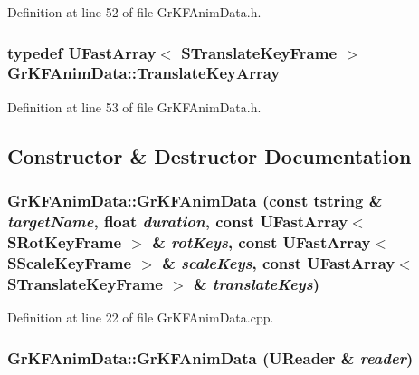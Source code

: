 Definition at line 52 of file GrKFAnimData.h.\hypertarget{class_gr_k_f_anim_data_38d6be96467bdb179c733bb1ed40d36f}{
\subsubsection[{TranslateKeyArray}]{\setlength{\rightskip}{0pt plus 5cm}typedef {\bf UFastArray}$<$ {\bf STranslateKeyFrame} $>$ {\bf GrKFAnimData::TranslateKeyArray}}}
\label{class_gr_k_f_anim_data_38d6be96467bdb179c733bb1ed40d36f}




Definition at line 53 of file GrKFAnimData.h.

\subsection{Constructor \& Destructor Documentation}
\hypertarget{class_gr_k_f_anim_data_3eb49b566e57e8864da2a6cd801af2fe}{
\subsubsection[{GrKFAnimData}]{\setlength{\rightskip}{0pt plus 5cm}GrKFAnimData::GrKFAnimData (const {\bf tstring} \& {\em targetName}, \/  float {\em duration}, \/  const {\bf UFastArray}$<$ {\bf SRotKeyFrame} $>$ \& {\em rotKeys}, \/  const {\bf UFastArray}$<$ {\bf SScaleKeyFrame} $>$ \& {\em scaleKeys}, \/  const {\bf UFastArray}$<$ {\bf STranslateKeyFrame} $>$ \& {\em translateKeys})}}
\label{class_gr_k_f_anim_data_3eb49b566e57e8864da2a6cd801af2fe}




Definition at line 22 of file GrKFAnimData.cpp.\hypertarget{class_gr_k_f_anim_data_3d55c09cf537c58a6a83eba0818e2b83}{
\subsubsection[{GrKFAnimData}]{\setlength{\rightskip}{0pt plus 5cm}GrKFAnimData::GrKFAnimData ({\bf UReader} \& {\em reader})}}
\label{class_gr_k_f_anim_data_3d55c09cf537c58a6a83eba0818e2b83}




